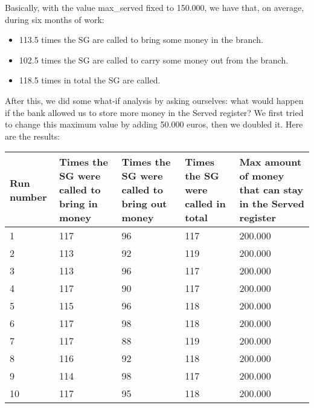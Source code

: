 \documentclass{article}
\begin{document}
Basically, with the value max\_served fixed to 150.000, we have that, on average, during six months of work:
\begin{itemize}
    \item 113.5 times the SG are called to bring some money in the branch.
    \item 102.5 times the SG are called to carry some money out from the branch.
    \item 118.5 times in total the SG are called.
\end{itemize}
After this, we did some what-if analysis by asking ourselves: what would happen if the bank allowed us to store more money in the Served register? We first tried to change this maximum value by adding 50.000 euros, then we doubled it. Here are the results:
\begin{center}
\begin{tabular}{ | m{2cm} | m{2.5cm}| m{2.5cm} | m{2.5cm} | m{3cm} |}
 \hline
 Run number & Times the SG were called to bring in money & Times the SG were called to bring out money & Times the SG were called in total & Max amount of money that can stay in the Served register\\
 \hline
 1 & 117 & 96 & 117 & 200.000\\
 \hline
 2 & 113 & 92 & 119 & 200.000\\
 \hline
 3 & 113 & 96 & 117 & 200.000\\
 \hline
 4 & 117 & 90 & 117 & 200.000\\
 \hline
 5 & 115 & 96 & 118 & 200.000\\
 \hline
 6 & 117 & 98 & 118 & 200.000\\
 \hline
 7 & 117 & 88 & 119 & 200.000\\
 \hline
 8 & 116 & 92 & 118 & 200.000\\
 \hline
 9 & 114 & 98 & 117 & 200.000\\
 \hline
 10 & 117 & 95 & 118 & 200.000\\
 \hline
\end{tabular}
\end{center}
\end{document}
